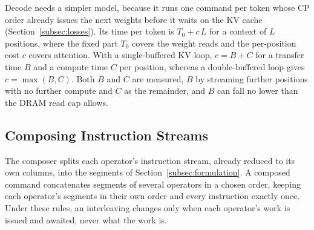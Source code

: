 Decode needs a simpler model, because it runs one command per token whose CP order already issues the next weights before it waits on the KV cache (Section~\ref{subsec:losses}).
Its time per token is $T_0 + c\,L$ for a context of $L$ positions, where the fixed part $T_0$ covers the weight reads and the per-position cost $c$ covers attention.
With a single-buffered KV loop, $c = B + C$ for a transfer time $B$ and a compute time $C$ per position, whereas a double-buffered loop gives $c = \max(B, C)$.
Both $B$ and $C$ are measured, $B$ by streaming further positions with no further compute and $C$ as the remainder, and $B$ can fall no lower than the DRAM read cap allows.

\subsection{Composing Instruction Streams}
\label{subsec:compose}

The composer splits each operator's instruction stream, already reduced to its own columns, into the segments of Section~\ref{subsec:formulation}.
A composed command concatenates segments of several operators in a chosen order, keeping each operator's segments in their own order and every instruction exactly once.
Under these rules, an interleaving changes only when each operator's work is issued and awaited, never what the work is.

